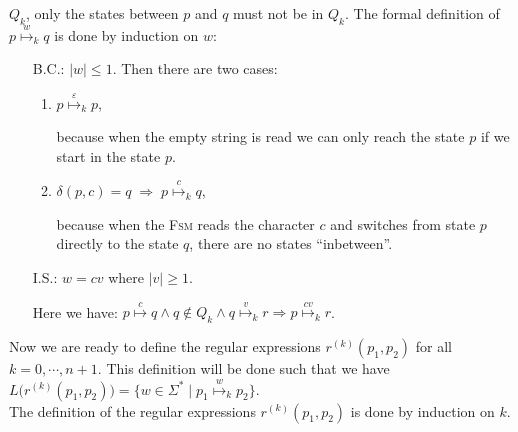 $Q_k$, only the states between $p$ and $q$ must not be in $Q_k$.
The formal definition of $p \stackrel{w}{\mapsto}_k q$ is done by induction on  $w$:
\begin{enumerate}
\item[B.C.:] $|w| \leq 1$.  Then there are two cases:
  \begin{enumerate}
  \item $p \stackrel{\varepsilon}{\mapsto}_k p$,

        because when the empty string is read we can only reach the state $p$ if we start in the state $p$.
  \item $\delta(p, c) = q \;\Rightarrow\; p \stackrel{c}{\mapsto}_k q$,

        because when the \textsc{Fsm} reads the character $c$ and switches from state $p$ directly
        to the state $q$, there are no states ``inbetween''.
  \end{enumerate}
\item[I.S.:] $w = cv$ where $|v| \geq 1$.

             Here we have:
             \hspace*{1.3cm}
            $p \stackrel{c}{\mapsto} q \wedge q \not\in Q_k \wedge q \stackrel{v}{\mapsto}_k r
              \Rightarrow p \stackrel{cv}{\mapsto}_k r$.
\end{enumerate}
Now we are ready to define the regular expressions $r^{(k)}(p_1, p_2)$ for all $k=0,\cdots,n+1$.
This definition will be done such that we have
\\[0.2cm]
\hspace*{1.3cm}
$L\bigl(r^{(k)}(p_1, p_2)\bigr) = \bigl\{ w \in \Sigma^* \mid p_1 \stackrel{w}{\mapsto}_k p_2 \bigr\}$.
\\[0.2cm]
The definition of the regular expressions $r^{(k)}(p_1, p_2)$ is done by induction on $k$.
